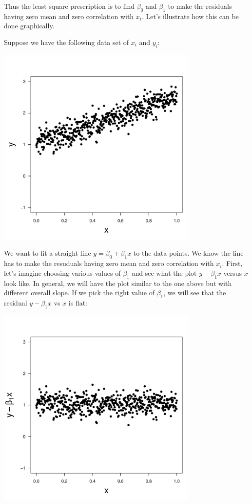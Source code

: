 \documentclass[11pt]{article}
\begin{document}
Thus the least square prescription is to find $\beta_0$ and $\beta_1$ to make 
the residuals having zero mean and zero correlation with $x_i$. Let's illustrate 
how this can be done graphically. 

Suppose we have the following data set of $x_i$ and $y_i$: 
\begin{center}
\includegraphics[width=10cm]{data.pdf}
\end{center}
We want to fit a straight line $y=\beta_0+\beta_1 x$ to the data points. We know the 
line has to make the resuduals having zero mean and zero correlation with $x_i$. 
First, let's imagine choosing various values of $\beta_1$ and see what the plot 
$y-\beta_1 x$ versus $x$ look like. In general, we will have the plot similar to the 
one above but with different overall slope. If we pick the right value of $\beta_1$, 
we will see that the residual $y-\beta_1 x$ vs $x$ is flat:  
\begin{center}
\includegraphics[width=10cm]{partial_residuals.pdf}
\end{center}
\end{document}
